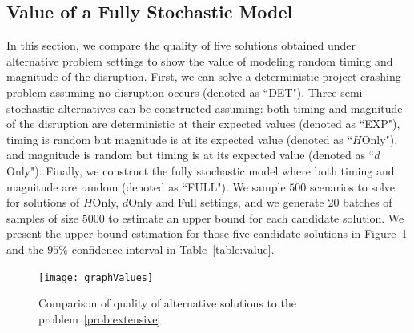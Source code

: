 \documentclass[11pt]{article}
\begin{document}
	\subsection{Value of a Fully Stochastic Model} \label{subsec:value}
	In this section, we compare the quality of five solutions obtained under alternative problem settings to show the value of modeling random timing and magnitude of the disruption. First, we can solve a deterministic project crashing problem assuming no disruption occurs (denoted as ``DET"). Three semi-stochastic alternatives can be constructed assuming: both timing and magnitude of the disruption are deterministic at their expected values (denoted as ``EXP"), timing is random but magnitude is at its expected value (denoted as ``\(H\)Only"), and magnitude is random but timing is at its expected value (denoted as ``\(d\)Only"). Finally, we construct the fully stochastic model where both timing and magnitude are random (denoted as ``FULL"). We sample \(500\) scenarios to solve for solutions of \(H\)Only, \(d\)Only and Full settings, and we generate 20 batches of samples of size \(5000\) to estimate an upper bound for each candidate solution. We present the upper bound estimation for those five candidate solutions in Figure~\ref{fig:value} and the \(95\%\) confidence interval in Table~\ref{table:value}.\\
	\begin{figure}
		\centering
		\texttt{[image: graphValues]}
		\caption{Comparison of quality of alternative solutions to the problem~\eqref{prob:extensive}}
		\label{fig:value}
	\end{figure}
	
\end{document}
